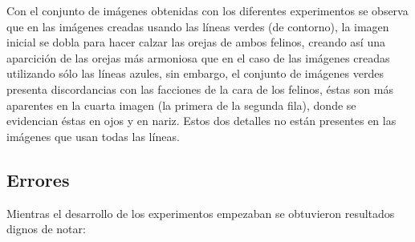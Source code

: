 \documentclass[conference]{IEEEtran}
\begin{document}
	Con el conjunto de imágenes obtenidas con los diferentes experimentos se observa que en las imágenes creadas usando las líneas verdes (de contorno), la imagen inicial se dobla para hacer calzar las orejas de ambos felinos, creando así una aparcición de las orejas más armoniosa que en el caso de las imágenes creadas utilizando sólo las líneas azules, sin embargo, el conjunto de imágenes verdes presenta discordancias con las facciones de la cara de los felinos, éstas son más aparentes en la cuarta imagen (la primera de la segunda fila), donde se evidencian éstas en ojos y en nariz. Estos dos detalles no están presentes en las imágenes que usan todas las líneas.





	
	\subsection{Errores}
	
	Mientras el desarrollo de los experimentos empezaban se obtuvieron resultados dignos de notar: \\
		
\end{document}

